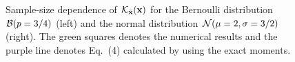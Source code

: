 \documentclass[a4paper]{article}
\newcommand{\xb}{\bar{\bf x}}
\begin{document}
\begin{figure}
  \begin{center}
  \end{center}
  \caption{Sample-size dependence of ${\cal K_{\xb}(\bf x)}$ for the Bernoulli distribution ${\cal B}(p=3/4)$ (left) and the normal distribution ${\cal N}(\mu=2,\sigma=3/2)$ (right). The green squares denotes the numerical results and the purple line denotes Eq.~(4) calculated by using the exact moments.}
\end{figure}
\end{document}
